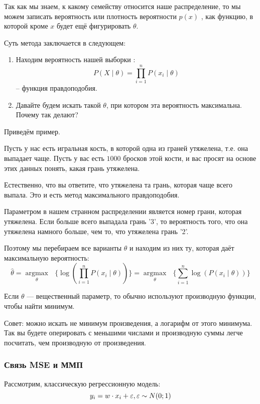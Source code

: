 Так как мы знаем, к какому семейству относится наше распределение, то мы можем записать вероятность или плотность вероятности $p(x)$ , как функцию, в которой кроме $x$ будет ещё фигурировать $\theta$. 

Суть метода заключается в следующем:

\begin{enumerate}
    \item Находим вероятность нашей выборки : $$P(X \mid \theta) = \prod_{i = 1}^{n} P(x_{i} \mid \theta)$$ -- функция правдоподобия.
    \item Давайте будем искать такой $\theta$, при котором эта вероятность максимальна. Почему так делают?
\end{enumerate}

Приведём пример.

Пусть у нас есть игральная кость, в которой одна из граней утяжелена, т.е. она выпадает чаще. Пусть у вас есть $1000$ бросков этой кости, и вас просят на основе этих данных понять, какая грань утяжелена. 

Естественно, что вы ответите, что утяжелена та грань, которая чаще всего выпала. Это и есть метод максимального правдоподобия.

Параметром в нашем странном распределении является номер грани, которая утяжелена. Если больше всего выпадала грань '3', то вероятность того, что она утяжелена намного больше, чем то, что утяжелена грань '2'. 

Поэтому мы перебираем все варианты $\theta$ и находим из них ту, которая даёт максимальную вероятность:
    $$\hat{\theta} = \underset{\theta}{\operatorname{argmax}} \mbox{ } \{ \log(\prod_{i = 1}^{n} P(x_{i} \mid \theta)) \} = \underset{\theta}{\operatorname{argmax}} \mbox{ } \{ \sum_{i = 1}^{n} \log(P(x_{i} \mid \theta)) \}$$
    
Если $\theta$ — вещественный параметр, то обычно используют производную функции, чтобы найти минимум. 

Совет: можно искать не минимум произведения, а логарифм от этого минимума. Так вы будете оперировать с меньшими числами и производную суммы легче посчитать, чем производную от произведения.
\subsubsection{Связь MSE и ММП}

Рассмотрим, классическую регрессионную модель: $$y_{i}= w \cdot x_{i} + \varepsilon, \varepsilon \sim N(0;1)$$

